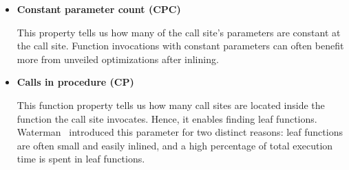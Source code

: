 \begin{itemize}
	\item \textbf{Constant parameter count (CPC)}

This property tells us how many of the call site's parameters are constant at
the call site. Function invocations with constant parameters can often benefit
more from unveiled optimizations after inlining.

	\item \textbf{Calls in procedure (CP)}

This function property tells us how many call sites are located inside the
function the call site invocates. Hence, it enables finding leaf functions.
Waterman~\cite{AdaptvCompilAndInlingWaterman} introduced this parameter for two
distinct reasons: leaf functions are often small and easily inlined, and a high
percentage of total execution time is spent in leaf functions.

\end{itemize}
